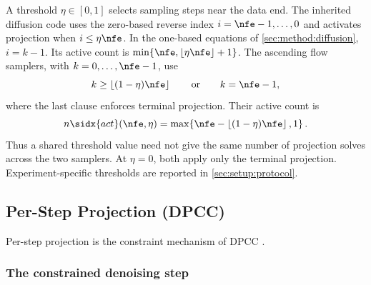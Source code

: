A threshold $\eta\in[0,1]$ selects sampling steps near the data end. The inherited diffusion code
uses the zero-based reverse index $i=\nfe-1,\ldots,0$ and activates projection when
$i\le\eta\nfe$. In the one-based equations of \autoref{sec:method:diffusion}, $i=k-1$.
Its active count is $\min\{\nfe,\lfloor\eta\nfe\rfloor+1\}$.
The ascending flow samplers, with $k=0,\ldots,\nfe-1$, use
\begin{equation}\label{eq:method:proj:gate}
  k\ge\left\lfloor(1-\eta)\nfe\right\rfloor
  \qquad\text{or}\qquad k=\nfe-1,
\end{equation}
where the last clause enforces terminal projection. Their active count is
\begin{equation}\label{eq:method:proj:nact}
  n\sidx{act}(\nfe,\eta)
  =\max\!\left\{\nfe-\left\lfloor(1-\eta)\nfe\right\rfloor,1\right\}.
\end{equation}
Thus a shared threshold value need not give the same number of projection solves across the two
samplers. At $\eta=0$, both apply only the terminal projection. Experiment-specific thresholds are
reported in \autoref{sec:setup:protocol}.

\subsection{Per-Step Projection (DPCC)}\label{sec:method:dpcc}

Per-step projection is the constraint mechanism of \ac{DPCC} \parencite{romer2025diffusion}.

\subsubsection*{The constrained denoising step}

